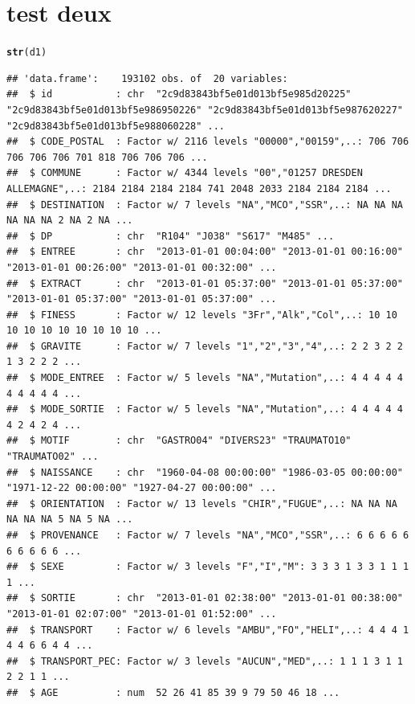 \documentclass[12pt,english,french,twoside]{report}\usepackage[]{graphicx}\usepackage[]{color}
\makeatletter
\newcommand{\hlkwd}[1]{\textcolor[rgb]{0.737,0.353,0.396}{\textbf{#1}}}%
\newenvironment{kframe}{%
 \def\at@end@of@kframe{}%
 \ifinner\ifhmode%
  \def\at@end@of@kframe{\end{minipage}}%
  \begin{minipage}{\columnwidth}%
 \fi\fi%
 \def\FrameCommand##1{\hskip\@totalleftmargin \hskip-\fboxsep
 \colorbox{shadecolor}{##1}\hskip-\fboxsep
     \hskip-\linewidth \hskip-\@totalleftmargin \hskip\columnwidth}%
 \MakeFramed {\advance\hsize-\width
   \@totalleftmargin\z@ \linewidth\hsize
   \@setminipage}}%
 {\par\unskip\endMakeFramed%
 \at@end@of@kframe}
\newenvironment{knitrout}{}{} %
\makeatother
\begin{document}
\chapter{test deux}
\begin{knitrout}
\color{fgcolor}\begin{kframe}
\begin{alltt}

\hlkwd{str}(d1)
\end{alltt}
\begin{verbatim}
## 'data.frame':	193102 obs. of  20 variables:
##  $ id           : chr  "2c9d83843bf5e01d013bf5e985d20225" "2c9d83843bf5e01d013bf5e986950226" "2c9d83843bf5e01d013bf5e987620227" "2c9d83843bf5e01d013bf5e988060228" ...
##  $ CODE_POSTAL  : Factor w/ 2116 levels "00000","00159",..: 706 706 706 706 706 701 818 706 706 706 ...
##  $ COMMUNE      : Factor w/ 4344 levels "00","01257 DRESDEN ALLEMAGNE",..: 2184 2184 2184 2184 741 2048 2033 2184 2184 2184 ...
##  $ DESTINATION  : Factor w/ 7 levels "NA","MCO","SSR",..: NA NA NA NA NA NA 2 NA 2 NA ...
##  $ DP           : chr  "R104" "J038" "S617" "M485" ...
##  $ ENTREE       : chr  "2013-01-01 00:04:00" "2013-01-01 00:16:00" "2013-01-01 00:26:00" "2013-01-01 00:32:00" ...
##  $ EXTRACT      : chr  "2013-01-01 05:37:00" "2013-01-01 05:37:00" "2013-01-01 05:37:00" "2013-01-01 05:37:00" ...
##  $ FINESS       : Factor w/ 12 levels "3Fr","Alk","Col",..: 10 10 10 10 10 10 10 10 10 10 ...
##  $ GRAVITE      : Factor w/ 7 levels "1","2","3","4",..: 2 2 3 2 2 1 3 2 2 2 ...
##  $ MODE_ENTREE  : Factor w/ 5 levels "NA","Mutation",..: 4 4 4 4 4 4 4 4 4 4 ...
##  $ MODE_SORTIE  : Factor w/ 5 levels "NA","Mutation",..: 4 4 4 4 4 4 2 4 2 4 ...
##  $ MOTIF        : chr  "GASTRO04" "DIVERS23" "TRAUMATO10" "TRAUMATO02" ...
##  $ NAISSANCE    : chr  "1960-04-08 00:00:00" "1986-03-05 00:00:00" "1971-12-22 00:00:00" "1927-04-27 00:00:00" ...
##  $ ORIENTATION  : Factor w/ 13 levels "CHIR","FUGUE",..: NA NA NA NA NA NA 5 NA 5 NA ...
##  $ PROVENANCE   : Factor w/ 7 levels "NA","MCO","SSR",..: 6 6 6 6 6 6 6 6 6 6 ...
##  $ SEXE         : Factor w/ 3 levels "F","I","M": 3 3 3 1 3 3 1 1 1 1 ...
##  $ SORTIE       : chr  "2013-01-01 02:38:00" "2013-01-01 00:38:00" "2013-01-01 02:07:00" "2013-01-01 01:52:00" ...
##  $ TRANSPORT    : Factor w/ 6 levels "AMBU","FO","HELI",..: 4 4 4 1 4 4 6 6 4 4 ...
##  $ TRANSPORT_PEC: Factor w/ 3 levels "AUCUN","MED",..: 1 1 1 3 1 1 2 2 1 1 ...
##  $ AGE          : num  52 26 41 85 39 9 79 50 46 18 ...
\end{verbatim}

\end{kframe}
\end{knitrout}
\end{document}
